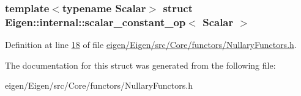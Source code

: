 \subsubsection*{template$<$typename Scalar$>$\newline
struct Eigen\+::internal\+::scalar\+\_\+constant\+\_\+op$<$ Scalar $>$}



Definition at line \hyperlink{eigen_2_eigen_2src_2_core_2functors_2_nullary_functors_8h_source_l00018}{18} of file \hyperlink{eigen_2_eigen_2src_2_core_2functors_2_nullary_functors_8h_source}{eigen/\+Eigen/src/\+Core/functors/\+Nullary\+Functors.\+h}.



The documentation for this struct was generated from the following file\+:\begin{DoxyCompactItemize}
\item 
eigen/\+Eigen/src/\+Core/functors/\+Nullary\+Functors.\+h\end{DoxyCompactItemize}

